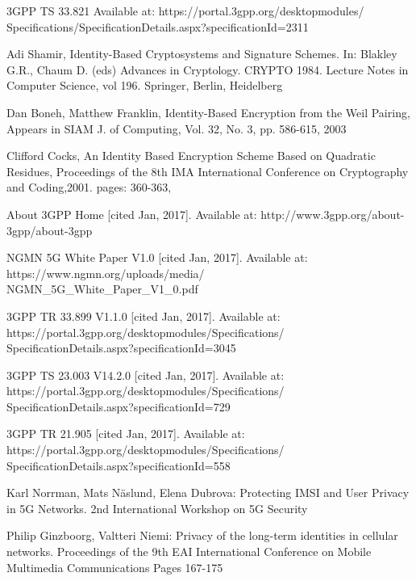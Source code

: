 \documentclass[runningheads,a4paper]{llncs} %
\begin{document}
\begin{thebibliography}{4}

 3GPP TS 33.821 Available at: https://portal.3gpp.org/desktopmodules/\\Specifications/SpecificationDetails.aspx?specificationId=2311

 Adi Shamir, Identity-Based Cryptosystems and Signature Schemes. In: Blakley G.R., Chaum D. (eds) Advances in Cryptology. CRYPTO 1984. Lecture Notes in Computer Science, vol 196. Springer, Berlin, Heidelberg


 Dan Boneh, Matthew Franklin, Identity-Based Encryption from the Weil Pairing, Appears in SIAM J. of Computing, Vol. 32, No. 3, pp. 586-615, 2003

 Clifford Cocks, An Identity Based Encryption Scheme Based on Quadratic Residues, Proceedings of the 8th IMA International Conference on Cryptography and Coding,2001. pages: 360-363, 

 About 3GPP Home [cited Jan, 2017]. Available at: http://www.3gpp.org/about-3gpp/about-3gpp

 NGMN 5G White Paper V1.0 [cited Jan, 2017]. Available at: https://www.ngmn.org/uploads/media/\\NGMN\_5G\_White\_Paper\_V1\_0.pdf

 3GPP TR 33.899 V1.1.0 [cited Jan, 2017]. Available at: https://portal.3gpp.org/desktopmodules/Specifications/\\SpecificationDetails.aspx?specificationId=3045

 3GPP TS 23.003 V14.2.0 [cited Jan, 2017]. Available at: https://portal.3gpp.org/desktopmodules/Specifications/\\SpecificationDetails.aspx?specificationId=729

 3GPP TR 21.905 [cited Jan, 2017]. Available at: https://portal.3gpp.org/desktopmodules/Specifications/\\SpecificationDetails.aspx?specificationId=558


 Karl Norrman, Mats N\"aslund, Elena Dubrova: Protecting IMSI and User Privacy in 5G Networks. 2nd International Workshop on 5G Security

 Philip Ginzboorg,  Valtteri Niemi: Privacy of the long-term identities in cellular networks. Proceedings of the 9th EAI International Conference on Mobile Multimedia Communications
Pages 167-175


\end{thebibliography}
\end{document}
